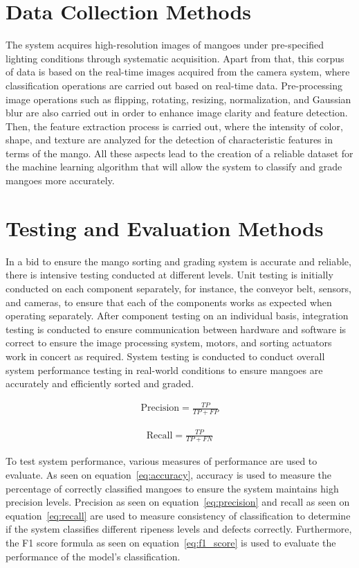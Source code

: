 \section{Data Collection Methods} \label{sec:dataset}
The system acquires high-resolution images of mangoes under pre-specified lighting conditions through systematic acquisition. Apart from that, this corpus of data is based on the real-time images acquired from the camera system, where classification operations are carried out based on real-time data. Pre-processing image operations such as flipping, rotating, resizing, normalization, and Gaussian blur are also carried out in order to enhance image clarity and feature detection. Then, the feature extraction process is carried out, where the intensity of color, shape, and texture are analyzed for the detection of characteristic features in terms of the mango. All these aspects lead to the creation of a reliable dataset for the machine learning algorithm that will allow the system to classify and grade mangoes more accurately.

\section{Testing and Evaluation Methods} \label{sec:trainandtest}
In a bid to ensure the mango sorting and grading system is accurate and reliable, there is intensive testing conducted at different levels. Unit testing is initially conducted on each component separately, for instance, the conveyor belt, sensors, and cameras, to ensure that each of the components works as expected when operating separately. After component testing on an individual basis, integration testing is conducted to ensure communication between hardware and software is correct to ensure the image processing system, motors, and sorting actuators work in concert as required. System testing is conducted to conduct overall system performance testing in real-world conditions to ensure mangoes are accurately and efficiently sorted and graded.

\begin{eqnarray}
	\text{Precision} = \frac{TP}{TP + FP}
	\label{eq:precision}
\end{eqnarray}

\begin{eqnarray}
	\text{Recall} = \frac{TP}{TP + FN}
	\label{eq:recall}
\end{eqnarray}


To test system performance, various measures of performance are used to evaluate. As seen on equation~\ref{eq:accuracy}, accuracy is used to measure the percentage of correctly classified mangoes to ensure the system maintains high precision levels. Precision as seen on equation~\ref{eq:precision} and recall as seen on equation~\ref{eq:recall} are used to measure consistency of classification to determine if the system classifies different ripeness levels and defects correctly. Furthermore, the F1 score formula as seen on equation~\ref{eq:f1_score} is used to evaluate the performance of the model's classification. 

